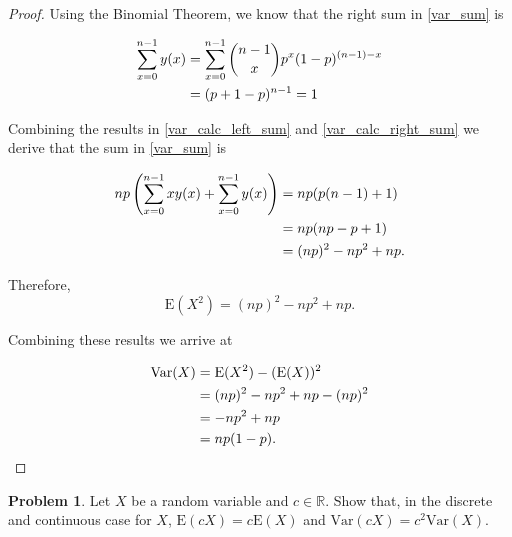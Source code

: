 \documentclass[12pt]{article}
\theoremstyle{definition}
\newtheorem{problem}{Problem}
\newcommand{\E}{\text{E}}
\newcommand{\V}{\text{Var}}
\begin{document}
\begin{proof}
  Using the Binomial Theorem, we know that the right sum in \eqref{var_sum} is

  \begin{align}
    \sum_{x=0}^{n - 1} y(x)
    &= \sum_{x=0}^{n - 1} {n - 1 \choose x} p^x (1-p)^{(n-1)-x} \notag \\
    &= (p + 1 - p)^{n-1} = 1 \label{var_calc_right_sum}
  \end{align}

  Combining the results in \eqref{var_calc_left_sum} and \eqref{var_calc_right_sum}
  we derive that the sum in \eqref{var_sum} is

  \begin{align}
    np \left( \sum_{x=0}^{n - 1} x y(x) + \sum_{x=0}^{n - 1} y(x) \right) &= np (p(n - 1) + 1) \notag \\
    &= np(np - p + 1) \notag \\
    &= (np)^2 - np^2 + np \notag.
  \end{align}

  Therefore, $$\E(X^2) = (np)^2 - np^2 + np.$$

  Combining these results we arrive at

  \begin{align}
    \V(X) &= \E(X^2) - (\E(X))^2 \notag \\ &= (np)^2 - np^2 + np - (np)^2 \notag \\ &= -np^2 + np \notag \\&= np(1-p).
  \end{align}

\end{proof}


\begin{problem}
  Let $X$ be a random variable and $c \in \mathbb{R}.$ Show that, in the
  discrete and continuous case for $X$, $\E(cX) = c\E(X)$ and
  $\V(cX) = c^2\V(X).$
\end{problem}
\end{document}
